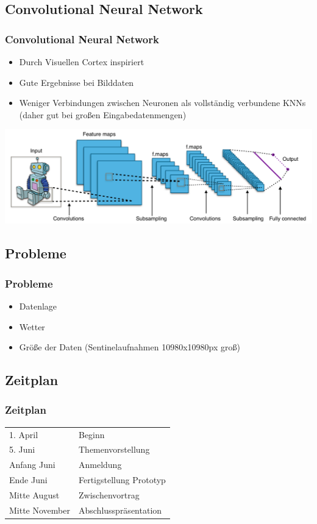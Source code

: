 \documentclass{beamer}
\begin{document}
\begin{frame}\section{Convolutional Neural Network}\frametitle{Convolutional Neural Network}
	\begin{itemize}
		\item Durch Visuellen Cortex inspiriert
		\item Gute Ergebnisse bei Bilddaten
		\item Weniger Verbindungen zwischen Neuronen als vollständig verbundene KNNs (daher gut bei großen Eingabedatenmengen)
	\end{itemize}
	\includegraphics[width=1\textwidth]{pics/cnn.PNG}
\end{frame}



\begin{frame}\section{Probleme}\frametitle{Probleme}
	\begin{itemize}
		\item Datenlage
		\item Wetter
		\item Größe der Daten (Sentinelaufnahmen 10980x10980px groß)
	\end{itemize}
\end{frame}


\begin{frame}\section{Zeitplan}\frametitle{Zeitplan}
\begin{tabular}{l l}
1. April & Beginn \\
5. Juni & Themenvorstellung\\
Anfang Juni & Anmeldung\\
Ende Juni & Fertigstellung Prototyp\\
Mitte August & Zwischenvortrag\\
Mitte November & Abschlusspräsentation
\end{tabular}
\end{frame}
\end{document}
